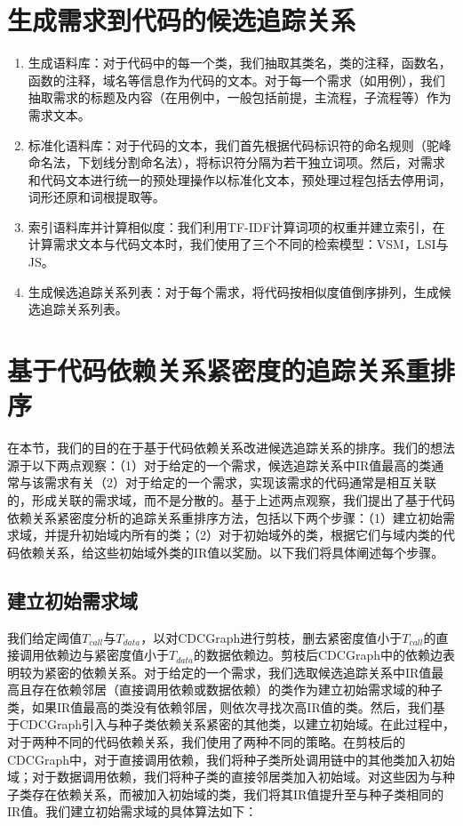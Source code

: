 \section{生成需求到代码的候选追踪关系}

\begin{enumerate}
  \item 生成语料库：对于代码中的每一个类，我们抽取其类名，类的注释，函数名，函数的注释，域名等信息作为代码的文本。对于每一个需求（如用例），我们抽取需求的标题及内容（在用例中，一般包括前提，主流程，子流程等）作为需求文本。
  \item 标准化语料库：对于代码的文本，我们首先根据代码标识符的命名规则（驼峰命名法，下划线分割命名法），将标识符分隔为若干独立词项。然后，对需求和代码文本进行统一的预处理操作以标准化文本，预处理过程包括去停用词，词形还原和词根提取等。
  \item 索引语料库并计算相似度：我们利用TF-IDF计算词项的权重并建立索引，在计算需求文本与代码文本时，我们使用了三个不同的检索模型：VSM\cite{antoniol2002recovering}，LSI\cite{marcus2003recovering}与JS\cite{abadi2008traceability}。
  \item 生成候选追踪关系列表：对于每个需求，将代码按相似度值倒序排列，生成候选追踪关系列表。
\end{enumerate}

\section{基于代码依赖关系紧密度的追踪关系重排序}
在本节，我们的目的在于基于代码依赖关系改进候选追踪关系的排序。我们的想法源于以下两点观察：（1）对于给定的一个需求，候选追踪关系中IR值最高的类通常与该需求有关（2）对于给定的一个需求，实现该需求的代码通常是相互关联的，形成关联的需求域\cite{burgstaller2010understanding}，而不是分散的。基于上述两点观察，我们提出了基于代码依赖关系紧密度分析的追踪关系重排序方法，包括以下两个步骤：（1）建立初始需求域，并提升初始域内所有的类；（2）对于初始域外的类，根据它们与域内类的代码依赖关系，给这些初始域外类的IR值以奖励。以下我们将具体阐述每个步骤。

\subsection{建立初始需求域}
我们给定阈值$T_{call}$与$T_{data}$，以对CDCGraph进行剪枝，删去紧密度值小于$T_{call}$的直接调用依赖边与紧密度值小于$T_{data}$的数据依赖边。剪枝后CDCGraph中的依赖边表明较为紧密的依赖关系。对于给定的一个需求，我们选取候选追踪关系中IR值最高且存在依赖邻居（直接调用依赖或数据依赖）的类作为建立初始需求域的种子类，如果IR值最高的类没有依赖邻居，则依次寻找次高IR值的类。然后，我们基于CDCGraph引入与种子类依赖关系紧密的其他类，以建立初始域。在此过程中，对于两种不同的代码依赖关系，我们使用了两种不同的策略。在剪枝后的CDCGraph中，对于直接调用依赖，我们将种子类所处调用链中的其他类加入初始域；对于数据调用依赖，我们将种子类的直接邻居类加入初始域。对这些因为与种子类存在依赖关系，而被加入初始域的类，我们将其IR值提升至与种子类相同的IR值。我们建立初始需求域的具体算法如下：

